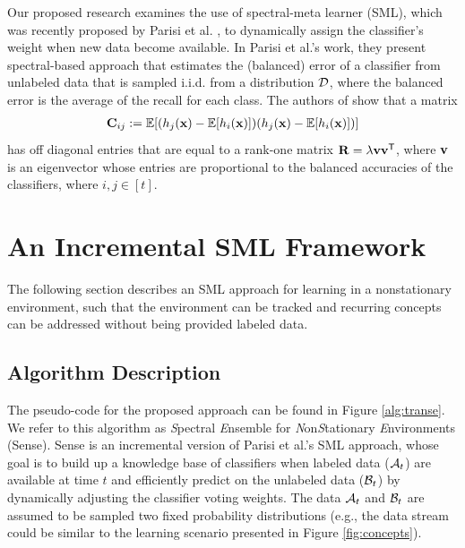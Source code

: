 \documentclass[10pt, conference]{IEEEtran}
\begin{document}
Our proposed research examines the use of spectral-meta learner (SML), which was recently proposed by Parisi et al. \cite{Parisi2014PNAS}, to dynamically assign the classifier's weight when new data become available. In Parisi et al.'s work, they present spectral-based approach that estimates the (balanced) error of a classifier from unlabeled data that is sampled i.i.d. from a distribution ${\mathcal D}$, where the balanced error is the average of the recall for each class. 
The authors of \cite{Parisi2014PNAS} show that a matrix  
\begin{align}
{\mathbf C}_{ij} := {\mathbb E}[(h_j({\mathbf x})-{\mathbb E}[h_i({\mathbf x})])(h_j({\mathbf x})-{\mathbb E}[h_i({\mathbf x})]) ] \nonumber
\end{align} 
\noindent has  off diagonal entries that are equal to a rank-one matrix ${\mathbf R} = \lambda {\mathbf v}{\mathbf v}^{\textsf{T}}$, where ${\mathbf v}$ is an eigenvector whose entries are proportional to the balanced accuracies of the classifiers, where $i,j \in [t]$. 




\section{An Incremental SML Framework}
\label{sec:proposed}

The following section describes an SML approach for learning in a nonstationary environment, such that the environment can be tracked and recurring concepts can be addressed without being provided labeled data.  

\subsection{Algorithm Description}

The pseudo-code for the proposed approach can be found in Figure \ref{alg:transe}. We refer to this algorithm as {\em S}pectral {\em E}nsemble for {\em N}on{\em S}tationary {\em E}nvironments (Sense). Sense is an incremental version of  Parisi et al.'s SML approach, whose goal  is to build up a knowledge base of classifiers when labeled data (${\mathcal A}_t$) are available at time $t$ and efficiently predict on the unlabeled data (${\mathcal B}_t$) by dynamically adjusting the classifier voting weights. The data ${\mathcal A}_t$ and ${\mathcal B}_t$ are assumed to be sampled two fixed probability distributions (e.g., the data stream could be similar to the learning scenario presented in Figure \ref{fig:concepts}).
\end{document}
